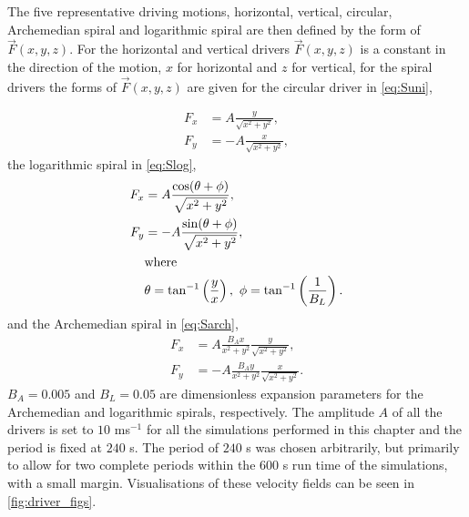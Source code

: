 The five representative driving motions, horizontal, vertical, circular, Archemedian spiral and logarithmic spiral are then defined by the form of $\vec{F}(x,y,z)$. For the horizontal and vertical drivers $\vec{F}(x,y,z)$ is a constant in the direction of the motion, $x$ for horizontal and $z$ for vertical, for the spiral drivers the forms of $\vec{F}(x,y,z)$ are given for the circular driver in \cref{eq:Suni},

\begin{subequations}
    \begin{align}
        F_x &= A \frac{y}{\sqrt{x^2 + y^2}},\\
        F_y &= - A \frac{x}{\sqrt{x^2 + y^2}},
    \end{align}
    \label{eq:Suni}
\end{subequations}
the logarithmic spiral in \cref{eq:Slog},
\begin{subequations}
    \begin{align}
        F_x &= A \frac{\cos(\theta + \phi)}{\sqrt{x^2 + y^2}},\\
        F_y &= - A \frac{\sin(\theta + \phi)}{\sqrt{x^2 + y^2}},\\
            &\text{where}\notag\\
            &\theta = \tan^{-1}\left(\frac{y}{x}\right),\ \phi = \tan^{-1}\left(\frac{1}{B_L}\right).\notag
    \end{align}
    \label{eq:Slog}
\end{subequations}
and the Archemedian spiral in \cref{eq:Sarch},
\begin{subequations}
    \begin{align}
        F_x &= A \frac{B_Ax}{x^2 + y^2} \frac{y}{\sqrt{x^2 + y^2}},\\
        F_y &= - A \frac{B_Ay}{x^2 + y^2} \frac{x}{\sqrt{x^2 + y^2}}.
    \end{align}
    \label{eq:Sarch}
\end{subequations}
$B_A = 0.005$ and $B_L = 0.05$ are dimensionless expansion parameters for the Archemedian  and logarithmic spirals, respectively.
The amplitude $A$ of all the drivers is set to $10$ ms$^{-1}$ for all the simulations performed in this chapter and the period is fixed at $240$ s.
The period of $240$ s was chosen arbitrarily, but primarily to allow for two complete periods within the $600$ s run time of the simulations, with a small margin.
Visualisations of these velocity fields can be seen in \cref{fig:driver_figs}.
